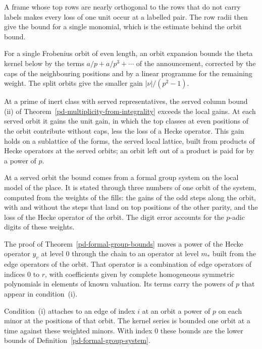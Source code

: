A frame whose top rows are nearly orthogonal to the rows that do not carry labels makes every
loss of one unit occur at a labelled pair. The row radii then give the bound for a single monomial,
which is the estimate behind the orbit bound.

For a single Frobenius orbit of even length, an orbit expansion bounds the theta kernel below by
the terms $a/p+a/p^3+\cdots$ of the announcement, corrected by the caps of the neighbouring
positions and by a linear programme for the remaining weight. The split orbits give the smaller
gain $|\nu|/(p^2-1)$.

At a prime of inert class with served representatives, the served column bound (ii) of
Theorem~\ref{pd-multiplicity-from-integrality} exceeds the local gains. At each served orbit it
gains the unit gain, in which the top classes at even positions of the orbit contribute without
caps, less the loss of a Hecke operator. This gain holds on a sublattice of the forms, the served
local lattice, built from products of Hecke operators at the served orbits; an orbit left out of a
product is paid for by a power of $p$.

At a served orbit the bound comes from a formal group system on the local model of the place. It
is stated through three numbers of one orbit of the system, computed from the weights of the fills:
the gains of the odd steps along the orbit, with and without the steps that land on top positions
of the other parity, and the loss of the Hecke operator of the orbit. The digit error accounts for
the $p$-adic digits of these weights.

The proof of Theorem~\ref{pd-formal-group-bounds} moves a power of the Hecke operator $y_v$ at level $0$
through the chain to an operator at level $m_*$ built from the edge operators of the orbit. That operator
is a combination of edge operators of indices $0$ to $r$, with coefficients given by complete homogeneous
symmetric polynomials in elements of known valuation. Its terms carry the powers of $p$ that appear in
condition~(i).

Condition~(i) attaches to an edge of index $i$ at an orbit a power of $p$ on each minor at the positions
of that orbit. The kernel series is bounded one orbit at a time against these weighted minors. With index
$0$ these bounds are the lower bounds of Definition~\ref{pd-formal-group-system}.

